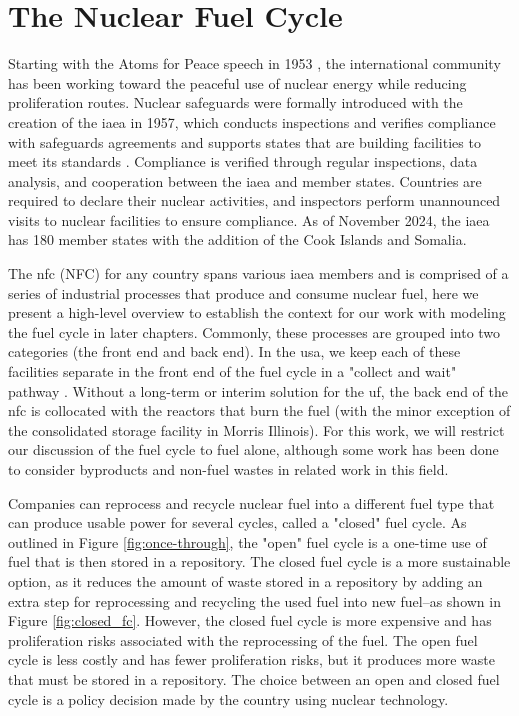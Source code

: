 \section{The Nuclear Fuel Cycle}
\label{sec:nfc}

Starting with the Atoms for Peace speech in 1953 \cite{atoms_for_peace}, the
international community has been working toward the peaceful use of nuclear
energy while reducing proliferation routes. Nuclear safeguards were formally
introduced with the creation of the \gls{iaea} in 1957, which conducts
inspections and verifies compliance with safeguards agreements and supports
states that are building facilities to meet its standards \cite{member_states}.
Compliance is verified through regular inspections, data analysis, and
cooperation between the \gls{iaea} and member states. Countries are required to
declare their nuclear activities, and inspectors perform unannounced visits to
nuclear facilities to ensure compliance. As of November 2024, the \gls{iaea}
has 180 member states with the addition of the Cook Islands and Somalia.

The \acrlong{nfc} (NFC) for any country spans various \gls{iaea} members and is
comprised of a series of industrial processes that produce and consume nuclear
fuel, here we present a high-level overview to establish the context for our
work with modeling the fuel cycle in later chapters. Commonly, these processes
are grouped into two categories (the front end and back end). In the \gls{usa},
we keep each of these facilities separate in the front end of the fuel cycle in
a "collect and wait" pathway \cite{cycle_risks}. Without a long-term or interim
solution for the \gls{uf}, the back end of the \gls{nfc} is collocated with the
reactors that burn the fuel (with the minor exception of the consolidated
storage facility in Morris Illinois). For this work, we will restrict our
discussion of the fuel cycle to fuel alone, although some work has been done to
consider byproducts and non-fuel wastes in related work in this field.

Companies can reprocess and recycle nuclear fuel into a different fuel type
that can produce usable power for several cycles, called a "closed" fuel cycle.
As outlined in Figure \ref{fig:once-through}, the "open" fuel cycle is a
one-time use of fuel that is then stored in a repository. The closed fuel cycle
is a more sustainable option, as it reduces the amount of waste stored in a
repository by adding an extra step for reprocessing and recycling the used fuel
into new fuel--as shown in Figure \ref{fig:closed_fc}. However, the closed fuel
cycle is more expensive and has proliferation risks associated with the
reprocessing of the fuel. The open fuel cycle is less costly and has fewer
proliferation risks, but it produces more waste that must be stored in a
repository. The choice between an open and closed fuel cycle is a policy
decision made by the country using nuclear technology.

